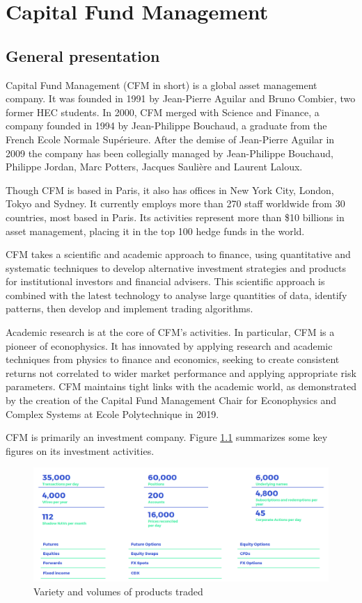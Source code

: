 \chapter{Capital Fund Management}
\label{chapter1}

\section{General presentation}
\label{chapter1_section1}


Capital Fund Management (CFM in short) is a global asset management company. It was founded in 1991 by Jean-Pierre Aguilar and Bruno Combier, two former HEC students. In 2000, CFM merged with Science and Finance, a company founded in 1994 by Jean-Philippe Bouchaud, a graduate from the French Ecole Normale Supérieure. After the demise of Jean-Pierre Aguilar in 2009 the company has been collegially managed by Jean-Philippe Bouchaud, Philippe Jordan, Marc Potters, Jacques Saulière and Laurent Laloux. 

Though CFM is based in Paris, it also has offices in New York City, London, Tokyo and Sydney. It currently employs more than 270 staff worldwide from 30 countries, most based in Paris. Its activities represent more than \$10 billions in asset management, placing it in the top 100 hedge funds in the world.

CFM takes a scientific and academic approach to finance, using quantitative and systematic techniques to develop alternative investment strategies and products for institutional investors and financial advisers. This scientific approach is combined with the latest technology to analyse large quantities of data, identify patterns, then develop and implement trading algorithms.

Academic research is at the core of CFM's activities. In particular, CFM is a pioneer of econophysics. It has innovated by applying research and academic techniques from physics to finance and economics, seeking to create consistent returns not correlated to wider market performance and applying appropriate risk parameters. CFM maintains tight links with the academic world, as demonstrated by the creation of the Capital Fund Management Chair for Econophysics and Complex Systems at Ecole Polytechnique in 2019.

CFM is primarily an investment company. Figure \ref{fig_c1_s1_1} summarizes some key figures on its investment activities.

\begin{figure}[H]
	\centering
	\includegraphics[scale=0.4]{images/cfm_products.png}
	\caption{Variety and volumes of products traded}
	\label{fig_c1_s1_1}
\end{figure}

